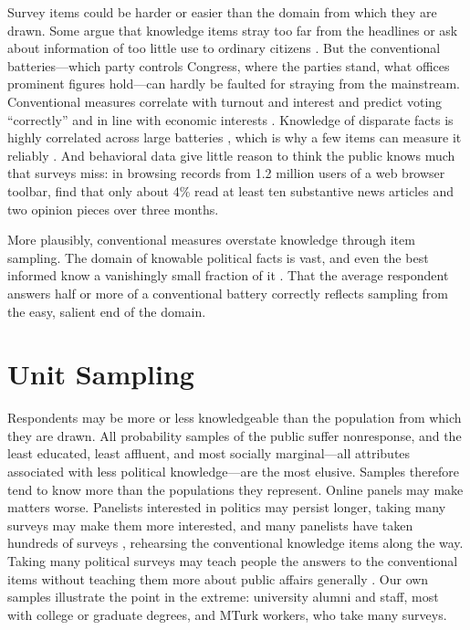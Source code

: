 \documentclass[11pt]{article}
\begin{document}
Survey items could be harder or easier than the domain from which they are drawn. Some argue that knowledge items stray too far from the headlines or ask about information of too little use to ordinary citizens \citep{lupia2006, lupia2016, boudreau2011}. But the conventional batteries---which party controls Congress, where the parties stand, what offices prominent figures hold---can hardly be faulted for straying from the mainstream. Conventional measures correlate with turnout and interest and predict voting ``correctly'' \citep{lau1997} and in line with economic interests \citep{gomez2001}. Knowledge of disparate facts is highly correlated across large batteries \citep{dellicarpini1996, barabas2014}, which is why a few items can measure it reliably \citep{dellicarpini1993}. And behavioral data give little reason to think the public knows much that surveys miss: in browsing records from 1.2 million users of a web browser toolbar, \citet{flaxman2016} find that only about 4\% read at least ten substantive news articles and two opinion pieces over three months.

More plausibly, conventional measures overstate knowledge through item sampling. The domain of knowable political facts is vast, and even the best informed know a vanishingly small fraction of it \citep{luskin2026}. That the average respondent answers half or more of a conventional battery correctly reflects sampling from the easy, salient end of the domain.

\section{Unit Sampling}

Respondents may be more or less knowledgeable than the population from which they are drawn. All probability samples of the public suffer nonresponse, and the least educated, least affluent, and most socially marginal---all attributes associated with less political knowledge---are the most elusive. Samples therefore tend to know more than the populations they represent. Online panels may make matters worse. Panelists interested in politics may persist longer, taking many surveys may make them more interested, and many panelists have taken hundreds of surveys \citep{hillygus2014}, rehearsing the conventional knowledge items along the way. Taking many political surveys may teach people the answers to the conventional items without teaching them more about public affairs generally \citep{ahler2017}. Our own samples illustrate the point in the extreme: university alumni and staff, most with college or graduate degrees, and MTurk workers, who take many surveys.
\end{document}
